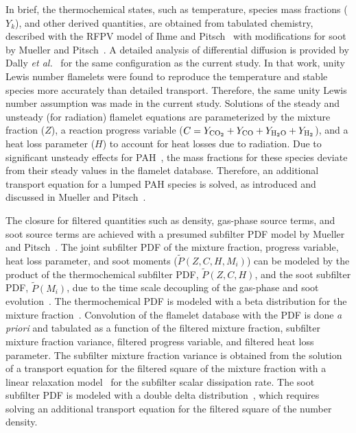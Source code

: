 In brief, the thermochemical states, such as temperature, species mass fractions ($Y_k$), and other derived quantities, are obtained from tabulated chemistry, described with the RFPV model of Ihme and Pitsch~\cite{ihme08} with modifications for soot by Mueller and Pitsch~\cite{mueller12}.  A detailed analysis of differential diffusion is provided by Dally \emph{et al.}~\cite{dally98b} for the same configuration as the current study.  In that work, unity Lewis number flamelets were found to reproduce the temperature and stable species more accurately than detailed transport.  Therefore, the same unity Lewis number assumption was made in the current study.  Solutions of the steady and unsteady (for radiation) flamelet equations are parameterized by the mixture fraction ($Z$), a reaction progress variable ($C = Y_{\rm CO_2} + Y_{\rm CO} + Y_{\rm H_2O} + Y_{\rm H_2}$), and a heat loss parameter ($H$) to account for heat losses due to radiation.  Due to significant unsteady effects for PAH~\cite{bisetti12}, the mass fractions for these species deviate from their steady values in the flamelet database.  Therefore, an additional transport equation for a lumped PAH species is solved, as introduced and discussed in Mueller and Pitsch~\cite{mueller12}.

The closure for filtered quantities such as density, gas-phase source terms, and soot source terms are achieved with a presumed subfilter PDF model by Mueller and Pitsch~\cite{mueller12, mueller11b}.  The joint subfilter PDF of the mixture fraction, progress variable, heat loss parameter, and soot moments ($\widetilde{P}\left(Z,C,H,M_i\right)$) can be modeled by the product of the thermochemical subfilter PDF, $\widetilde{P}\left(Z,C,H\right)$, and the soot subfilter PDF, $\widetilde{P}\left(M_i\right)$, due to the time scale decoupling of the gas-phase and soot evolution~\cite{mueller11b}.  The thermochemical PDF is modeled with a beta distribution for the mixture fraction~\cite{cook94}.  Convolution of the flamelet database with the PDF is done \emph{a priori} and tabulated as a function of the filtered mixture fraction, subfilter mixture fraction variance, filtered progress variable, and filtered heat loss parameter.  The subfilter mixture fraction variance is obtained from the solution of a transport equation for the filtered square of the mixture fraction with a linear relaxation model~\cite{ihme08b} for the subfilter scalar dissipation rate.  The soot subfilter PDF is modeled with a double delta distribution~\cite{mueller11b}, which requires solving an additional transport equation for the filtered square of the number density.

